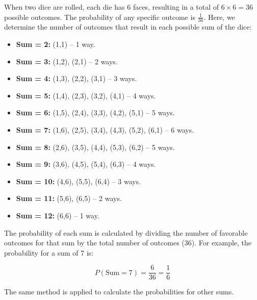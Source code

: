             \begin{solution}
            When two dice are rolled, each die has 6 faces, resulting in a total of \(6 \times 6 = 36\) possible outcomes. The probability of any specific outcome is \(\frac{1}{36}\). Here, we determine the number of outcomes that result in each possible sum of the dice:
            
            \begin{itemize}
                \item \textbf{Sum = 2:} (1,1) -- 1 way.
                \item \textbf{Sum = 3:} (1,2), (2,1) -- 2 ways.
                \item \textbf{Sum = 4:} (1,3), (2,2), (3,1) -- 3 ways.
                \item \textbf{Sum = 5:} (1,4), (2,3), (3,2), (4,1) -- 4 ways.
                \item \textbf{Sum = 6:} (1,5), (2,4), (3,3), (4,2), (5,1) -- 5 ways.
                \item \textbf{Sum = 7:} (1,6), (2,5), (3,4), (4,3), (5,2), (6,1) -- 6 ways.
                \item \textbf{Sum = 8:} (2,6), (3,5), (4,4), (5,3), (6,2) -- 5 ways.
                \item \textbf{Sum = 9:} (3,6), (4,5), (5,4), (6,3) -- 4 ways.
                \item \textbf{Sum = 10:} (4,6), (5,5), (6,4) -- 3 ways.
                \item \textbf{Sum = 11:} (5,6), (6,5) -- 2 ways.
                \item \textbf{Sum = 12:} (6,6) -- 1 way.
            \end{itemize}
            
            The probability of each sum is calculated by dividing the number of favorable outcomes for that sum by the total number of outcomes (36). For example, the probability for a sum of 7 is:
            
            \[ P(\text{Sum} = 7) = \frac{6}{36} = \frac{1}{6} \]
            
            The same method is applied to calculate the probabilities for other sums.
            \end{solution}

